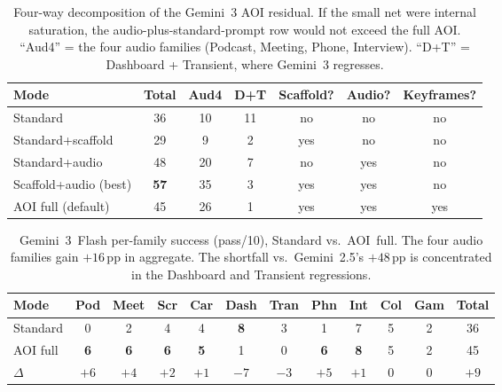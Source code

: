 \documentclass[11pt]{article}
\begin{document}
\begin{table}[!h]
\centering
\caption{Four-way decomposition of the Gemini~3 AOI residual. If the small net
were internal saturation, the audio-plus-standard-prompt row would not exceed the
full AOI. ``Aud4'' = the four audio families (Podcast, Meeting, Phone, Interview).
``D+T'' = Dashboard + Transient, where Gemini~3 regresses.}
\label{tab:gemini3_audio_only}
\small
\setlength{\tabcolsep}{4pt}
\begin{tabular}{@{}lcccccc@{}}
\toprule
\textbf{Mode} & \textbf{Total} & \textbf{Aud4} & \textbf{D+T} & \textbf{Scaffold?} & \textbf{Audio?} & \textbf{Keyframes?} \\
\midrule
Standard              & 36 & 10 & 11 & no  & no  & no  \\
Standard+scaffold     & 29 & 9  & 2  & yes & no  & no  \\
Standard+audio        & 48 & 20 & 7  & no  & yes & no  \\
\rowcolor{bestcolor}
Scaffold+audio (best) & \textbf{57} & 35 & 3  & yes & yes & no  \\
AOI full (default)    & 45 & 26 & 1  & yes & yes & yes \\
\bottomrule
\end{tabular}
\end{table}

\begin{table}[!h]
\centering
\caption{Gemini~3~Flash per-family success (pass/10), Standard vs.\ AOI~full. The
four audio families gain $+16$\,pp in aggregate. The shortfall vs.\ Gemini~2.5's
$+48$\,pp is concentrated in the Dashboard and Transient regressions.}
\label{tab:gemini3_percat}
\small
\setlength{\tabcolsep}{3pt}
\begin{tabular}{@{}l cccccccccc c@{}}
\toprule
\textbf{Mode} & Pod & Meet & Scr & Car & Dash & Tran & Phn & Int & Col & Gam & \textbf{Total} \\
\midrule
Standard & 0 & 2 & 4 & 4 & \textbf{8} & 3 & 1 & 7 & 5 & 2 & 36 \\
AOI full & \textbf{6} & \textbf{6} & \textbf{6} & \textbf{5} & 1 & 0 & \textbf{6} & \textbf{8} & 5 & 2 & 45 \\
\midrule
$\Delta$ & $+6$ & $+4$ & $+2$ & $+1$ & $-7$ & $-3$ & $+5$ & $+1$ & 0 & 0 & $+9$ \\
\bottomrule
\end{tabular}
\end{table}
\end{document}
